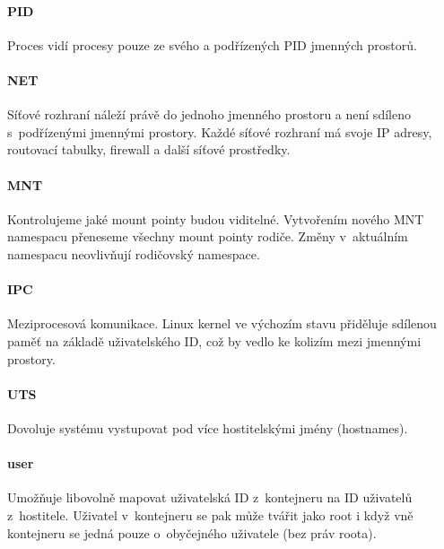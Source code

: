 \paragraph{PID}

Proces vidí procesy pouze ze svého a podřízených PID jmenných prostorů.
\cite{pid_namespaces}

\paragraph{NET}

Síťové rozhraní náleží právě do jednoho jmenného prostoru a není sdíleno s~podřízenými jmennými prostory.
Každé síťové rozhraní má svoje IP adresy, routovací tabulky, firewall a další síťové prostředky. 
\cite{namespaces}

\paragraph{MNT}

Kontrolujeme jaké mount pointy budou viditelné.
Vytvořením nového MNT namespacu přeneseme všechny mount pointy rodiče.
Změny v~aktuálním namespacu neovlivňují rodičovský namespace.
\cite{mnt_namespaces}

\paragraph{IPC}

Meziprocesová komunikace.
Linux kernel ve výchozím stavu přiděluje sdílenou paměť na základě uživatelského ID, což by vedlo ke kolizím mezi jmennými prostory.
\cite{namespaces}


\paragraph{UTS}

Dovoluje systému vystupovat pod více hostitelskými jmény (hostnames).
\cite{namespaces}

\paragraph{user}

Umožňuje libovolně mapovat uživatelská ID z~kontejneru na ID uživatelů z~hostitele.
Uživatel v~kontejneru se pak může tvářit jako root i když vně kontejneru se jedná pouze o~obyčejného uživatele (bez práv roota).
\cite{user_namespaces}

